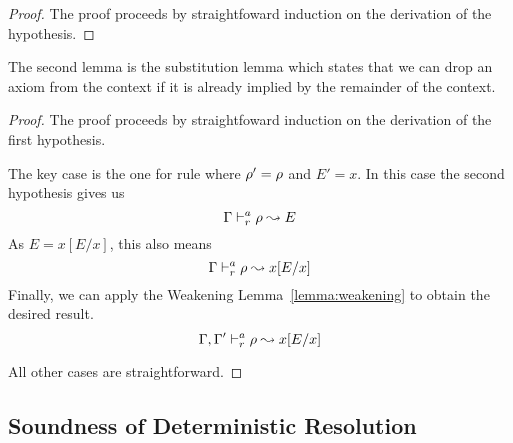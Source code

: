 \begin{proof}
The proof proceeds by straightfoward induction on the derivation of the hypothesis.
\end{proof}

The second lemma is the substitution lemma which states that
we can drop an axiom from the context if it is already implied
by the remainder of the context.

{\centering
{}}

\begin{proof}
The proof proceeds by straightfoward induction on the derivation of the first
hypothesis.

The key case is the one for rule  where $\rho' = \rho$ and
$E' = x$. In this case the second hypothesis gives us 
\begin{equation*}
\Gamma \vdash^a_{r} \rho \leadsto E
\end{equation*}
As $E = x[E/x]$, this also means
\begin{equation*}
\Gamma \vdash^a_{r} \rho \leadsto x[E/x]
\end{equation*}
Finally, we can apply the Weakening Lemma~\ref{lemma:weakening} to obtain the
desired result.
\begin{equation*}
\Gamma, \Gamma' \vdash^a_{r} \rho \leadsto x[E/x]
\end{equation*}

All other cases are straightforward.
\end{proof}

\subsection{Soundness of Deterministic Resolution}

